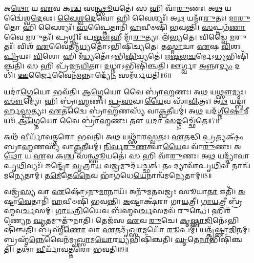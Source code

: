 𑌅\-\ul{𑌥𑍋} 𑌯 \ul{𑌏}\-𑌵 𑌕\-\ul{𑌶𑍍𑌚} 𑌸\-\ul{𑌨𑍍𑌥𑍍𑌸𑍂}\-𑌯𑌤𑍇॑।
𑌸 𑌹𑌿 𑌵𑌾᳴\-\ul{𑌰𑍁}\-𑌣𑌃।
𑌅\-\ul{𑌥} 𑌯𑌦𑍍𑌵𑍈॑𑌶𑍍𑌵\-\ul{𑌦𑍇}\-𑌵𑌃।
\-\ul{𑌵𑍈}\-\-\ul{𑌶𑍍𑌵}\-\-\ul{𑌦𑍇}\-𑌵𑍋 𑌹𑌿 𑌵𑍈𑌶𑍍𑌯𑌃᳴।
𑌅\-\ul{𑌥} 𑌯𑌨𑍍𑌮𑌾᳴\-\ul{𑌰𑍁}\-𑌤𑌃।
\-\ul{𑌮𑌾}\-\-\ul{𑌰𑍁}\-𑌤𑍋 𑌹𑌿 𑌵𑍈𑌶𑍍𑌯𑌃᳴।
\-\ul{𑌸}\-𑌪𑍍𑌤𑍈𑌤𑌾𑌨𑌿᳴ \ul{𑌹}\-𑌵𑍀𑍞𑌷𑌿᳴ 𑌭𑌵𑌨𑍍𑌤𑌿।
\-\ul{𑌸}\-𑌪𑍍𑌤𑌗᳴\-\ul{𑌣𑌾} 𑌵𑍈 \ul{𑌮}\-𑌰𑍁𑌤𑌃᳴।
𑌪𑍃𑌶𑍍𑌞𑌿𑌃᳴ 𑌪\-\ul{𑌷𑍍𑌠𑍗}\-𑌹𑍀 𑌮𑌾᳴\-\ul{𑌰𑍁}\-𑌤𑍍𑌯𑌾 𑌲᳴𑌭𑍍𑌯𑌤𑍇।
𑌵𑌿𑌡𑍍𑌵𑍈 \ul{𑌮}\-𑌰𑍁𑌤𑌃᳴।
𑌵𑌿𑌶᳴ \ul{𑌏}\-𑌵𑍈𑌤𑌨𑍍𑌮᳴\-\ul{𑌧𑍍𑌯}\-𑌤𑍋᳴\-𑌽𑌭𑌿𑌷𑌿᳴𑌚𑍍𑌯𑌤𑍇।
𑌤\-\ul{𑌸𑍍𑌮𑌾}\-𑌦𑍍𑌵𑌾 \ul{𑌏}\-𑌷 \ul{𑌵𑌿}\-𑌶𑌃 \ul{𑌪𑍍𑌰𑌿}\-𑌯𑌃।
\-\ul{𑌵𑌿}\-𑌶𑍋 𑌹𑌿 𑌮᳴\-\ul{𑌧𑍍𑌯}\-𑌤𑍋᳴\-𑌽𑌭𑌿\-\ul{𑌷𑌿}\-𑌚𑍍𑌯𑌤𑍇॑।
\-\ul{𑌋}\-\-\ul{𑌷}\-\-\ul{𑌭}\-\-\ul{𑌚}\-𑌰𑍍𑌮𑍇\-𑌽\-\ul{𑌧𑍍𑌯}\-𑌭𑌿𑌷𑌿᳴𑌞𑍍𑌚𑌤𑌿।
𑌸 𑌹𑌿 𑌪𑍍𑌰᳴𑌜𑌨\-\ul{𑌯𑌿}\-𑌤𑌾।
\-\ul{𑌦}\-𑌧𑍍𑌨𑌾\-𑌽𑌭𑌿𑌷𑌿᳴𑌞𑍍𑌚𑌤𑌿।
𑌊𑌰𑍍𑌗𑍍𑌵𑌾 \ul{𑌅}\-𑌨𑍍𑌨𑌾\-\ul{𑌦𑍍𑌯𑌂} 𑌦𑌧𑌿᳴।
\-\ul{𑌊}\-𑌰𑍍𑌜𑍈𑌵𑍈𑌨᳴\-\ul{𑌮}\-𑌨𑍍𑌨𑌾𑌦𑍍𑌯𑍇᳴\-\ul{𑌨} 𑌸𑌮᳴𑌰𑍍𑌧𑌯𑌤𑌿॥6॥\anuvakamend[\-\ul{𑌵𑌾}\-\-\ul{𑌰𑍁}\-𑌣𑍋 𑌵𑌿𑌡𑍍𑌵𑍈 \ul{𑌮}\-𑌰𑍁\-\ul{𑌤𑍋}\-\-𑌽𑌷𑍍𑌟𑍗 𑌚᳴]

𑌯𑌦𑌾॑\-\ul{𑌗𑍍𑌨𑍇}\-𑌯𑍋 𑌭𑌵᳴𑌤𑌿।
\-\ul{𑌆}\-\-\ul{𑌗𑍍𑌨𑍇}\-𑌯𑍋 𑌵𑍈 𑌬𑍍𑌰𑌾॑\-\ul{𑌹𑍍𑌮}\-𑌣𑌃।
𑌅\-\ul{𑌥} 𑌯\-\ul{𑌥𑍍𑌸𑍗}\-𑌮𑍍𑌯𑌃।
\-\ul{𑌸𑍗}\-𑌮𑍍𑌯𑍋 𑌹𑌿 𑌬𑍍𑌰𑌾॑\-\ul{𑌹𑍍𑌮}\-𑌣𑌃।
\-\ul{𑌪𑍍𑌰}\-\-\ul{𑌸}\-𑌵𑌾\-\ul{𑌯𑍈}\-𑌵 𑌸𑌾᳴\-\ul{𑌵𑌿}\-𑌤𑍍𑌰𑌃।
𑌅\-\ul{𑌥} 𑌯𑌦𑍍𑌬𑌾᳴𑌰𑍍\mbox{}𑌹\-\ul{𑌸𑍍𑌪}\-𑌤𑍍𑌯𑌃।
\-\ul{𑌏}\-𑌤𑌦𑍍𑌵𑍈 𑌬𑍍𑌰𑌾॑\-\ul{𑌹𑍍𑌮}\-𑌣𑌸𑍍𑌯᳴ 𑌵𑌾\-\ul{𑌕𑍍𑌪}\-𑌤𑍀𑌯𑌮𑍍॑।
𑌅\-\ul{𑌥} 𑌯𑌦᳴𑌗𑍍𑌨𑍀\-\ul{𑌷𑍋}\-𑌮𑍀𑌯𑌃᳴।
\-\ul{𑌆}\-\-\ul{𑌗𑍍𑌨𑍇}\-𑌯𑍋 𑌵𑍈 𑌬𑍍𑌰𑌾॑\-\ul{𑌹𑍍𑌮}\-𑌣𑌃।
𑌤𑍗 \ul{𑌯}\-𑌦𑌾 \ul{𑌸}\-𑌙𑍍𑌗𑌚𑍍𑌛𑍇᳴𑌤𑍇॥7॥

𑌅𑌥᳴ \ul{𑌵𑍀}\-𑌰𑍍𑌯𑌾᳴𑌵𑌤𑍍𑌤𑌰𑍋 𑌭𑌵𑌤𑌿।
𑌅\-\ul{𑌥} 𑌯𑌥𑍍𑌸𑌾᳴𑌰\-\ul{𑌸𑍍𑌵}\-𑌤𑌃।
\-\ul{𑌏}\-𑌤𑌦𑍍𑌧𑌿 \ul{𑌪𑍍𑌰}\-𑌤𑍍𑌯𑌕𑍍𑌷𑌂᳴ 𑌬𑍍𑌰𑌾\-\ul{𑌹𑍍𑌮}\-𑌣𑌸𑍍𑌯᳴ 𑌵𑌾\-\ul{𑌕𑍍𑌪}\-𑌤𑍀𑌯𑌮𑍍॑।
\-\ul{𑌨𑌿}\-\-\ul{𑌰𑍍𑌵}\-\-\ul{𑌰𑍁}\-\-\ul{𑌣}\-𑌤𑍍𑌵𑌾\-\ul{𑌯𑍈}\-𑌵 𑌵𑌾᳴\-\ul{𑌰𑍁}\-𑌣𑌃।
𑌅\-\ul{𑌥𑍋} 𑌯 \ul{𑌏}\-𑌵 𑌕\-\ul{𑌶𑍍𑌚} 𑌸\-\ul{𑌨𑍍𑌥𑍍𑌸𑍂}\-𑌯𑌤𑍇॑।
𑌸 𑌹𑌿 𑌵𑌾᳴\-\ul{𑌰𑍁}\-𑌣𑌃।
𑌅\-\ul{𑌥} 𑌯𑌦𑍍𑌦𑍍𑌯𑌾᳴𑌵𑌾𑌪𑍃\-\ul{𑌥𑌿}\-𑌵𑍍𑌯𑌃᳴।
𑌇𑌨𑍍𑌦𑍍𑌰𑍋᳴ \ul{𑌵𑍃}\-𑌤𑍍𑌰𑌾\-\ul{𑌯} 𑌵\-\ul{𑌜𑍍𑌰}\-𑌮𑍁𑌦᳴𑌯𑌚𑍍𑌛𑌤𑍍।
𑌤𑌂 𑌦𑍍𑌯𑌾𑌵𑌾᳴𑌪𑍃\-\ul{𑌥𑌿}\-𑌵𑍀 𑌨𑌾𑌨𑍍𑌵᳴𑌮𑌨𑍍𑌯𑍇𑌤𑌾𑌮𑍍।
𑌤\-\ul{𑌮𑍇}\-𑌤𑍇\-\ul{𑌨𑍈}\-𑌵 𑌭𑌾᳴\-\ul{𑌗}\-𑌧𑍇\-\ul{𑌯𑍇}\-𑌨𑌾𑌨𑍍𑌵᳴𑌮𑌨𑍍𑌯𑍇𑌤𑌾𑌮𑍍॥8॥

𑌵𑌜𑍍𑌰᳴\-\ul{𑌸𑍍𑌯} 𑌵𑌾 \ul{𑌏}\-𑌷𑍋᳴\-𑌽𑌨𑍁\-\ul{𑌮𑌾}\-𑌨𑌾𑌯᳴।
𑌅𑌨𑍁᳴𑌮𑌤𑌵𑌜𑍍𑌰𑌃 𑌸𑍂𑌯𑌾\-\ul{𑌤𑌾} 𑌇𑌤𑌿᳴।
\-\ul{𑌅}\-𑌷𑍍𑌟𑌾\-\ul{𑌵𑍇}\-𑌤𑌾𑌨𑌿᳴ \ul{𑌹}\-𑌵𑍀𑍞𑌷𑌿᳴ 𑌭𑌵𑌨𑍍𑌤𑌿।
\-\ul{𑌅}\-𑌷𑍍𑌟𑌾𑌕𑍍𑌷᳴𑌰𑌾 𑌗𑌾\-\ul{𑌯}\-𑌤𑍍𑌰𑍀।
\-\ul{𑌗𑌾}\-\-\ul{𑌯}\-𑌤𑍍𑌰𑍀 𑌬𑍍𑌰᳴𑌹𑍍𑌮𑌵\-\ul{𑌰𑍍𑌚}\-𑌸𑌮𑍍।
\-\ul{𑌗𑌾}\-\-\ul{𑌯}\-\-\ul{𑌤𑍍𑌰𑌿}\-𑌯𑍈𑌵 𑌬᳴𑌹𑍍𑌮𑌵\-\ul{𑌰𑍍𑌚}\-𑌸𑌮𑌵᳴ 𑌰𑍁𑌨𑍍𑌧𑍇।
𑌹𑌿𑌰᳴𑌣𑍍𑌯𑍇𑌨 \ul{𑌘𑍃}\-𑌤𑌮𑍁𑌤𑍍𑌪𑍁᳴𑌨𑌾𑌤𑌿।
𑌤𑍇𑌜᳴𑌸 \ul{𑌏}\-𑌵 \ul{𑌰𑍁}\-𑌚𑍇।
\-\ul{𑌕𑍃}\-\-\ul{𑌷𑍍𑌣𑌾}\-\-\ul{𑌜𑌿}\-𑌨𑍇᳴\-𑌽𑌭𑌿𑌷𑌿᳴𑌞𑍍𑌚𑌤𑌿।
𑌬𑍍𑌰𑌹𑍍𑌮᳴\-\ul{𑌣𑍋} 𑌵𑌾 \ul{𑌏}\-𑌤𑌦𑍃᳴\-\ul{𑌖𑍍𑌸𑌾}\-𑌮𑌯𑍋᳴ \ul{𑌰𑍂}\-𑌪𑌮𑍍।
𑌯𑌤𑍍𑌕𑍃᳴𑌷𑍍𑌣𑌾\-\ul{𑌜𑌿}\-𑌨𑌮𑍍।
𑌬𑍍𑌰𑌹𑍍𑌮᳴\-\ul{𑌨𑍍𑌨𑍇}\-𑌵𑍈𑌨᳴𑌮𑍃\-\ul{𑌖𑍍𑌸𑌾}\-𑌮\-\ul{𑌯𑍋}\-𑌰\-\ul{𑌧𑍍𑌯}\-𑌭𑌿𑌷𑌿᳴𑌞𑍍𑌚𑌤𑌿।
\-\ul{𑌘𑍃}\-𑌤𑍇\-\ul{𑌨𑌾}\-𑌭𑌿𑌷𑌿᳴𑌞𑍍𑌚𑌤𑌿।
𑌤𑌥𑌾᳴ \ul{𑌵𑍀}\-𑌰𑍍𑌯𑌾᳴𑌵𑌤𑍍𑌤𑌰𑍋 𑌭𑌵𑌤𑌿॥9॥\anuvakamend[\-\ul{𑌸}\-𑌙𑍍𑌗𑌚𑍍𑌛𑍇᳴𑌤𑍇 𑌭𑌾\-\ul{𑌗}\-𑌧𑍇\-\ul{𑌯𑍇}\-𑌨𑌾𑌨𑍍𑌵᳴𑌮𑌨𑍍𑌯𑍇𑌤𑌾𑍞 \ul{𑌰𑍂}\-𑌪𑌂 \ul{𑌚}\-𑌤𑍍𑌵𑌾𑌰𑌿᳴ 𑌚]

